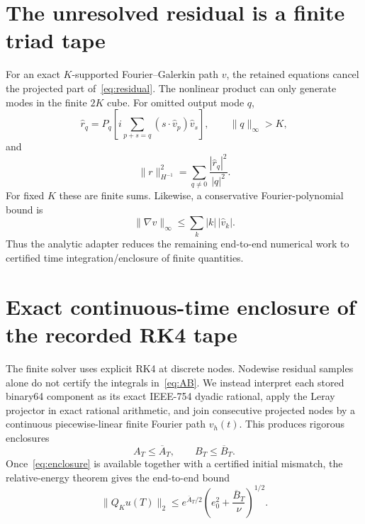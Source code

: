 \documentclass[11pt]{article}
\theoremstyle{definition}
\begin{document}
\section{The unresolved residual is a finite triad tape}

For an exact $K$-supported Fourier--Galerkin path $v$, the retained equations cancel the projected
part of~\eqref{eq:residual}.  The nonlinear product can only generate modes in the finite
$2K$ cube.  For omitted output mode $q$,
\begin{equation}\label{eq:residualmode}
\widehat r_q
=
P_q\left[
 i\sum_{p+s=q}(s\cdot\widehat v_p)\widehat v_s
\right],
\qquad \|q\|_\infty>K,
\end{equation}
and
\begin{equation}\label{eq:hminusone}
\|r\|_{H^{-1}}^2
=
\sum_{q\ne0}\frac{|\widehat r_q|^2}{|q|^2}.
\end{equation}
For fixed $K$ these are finite sums.  Likewise, a conservative Fourier-polynomial bound is
\begin{equation}\label{eq:gradlinf}
\|\nabla v\|_\infty
\le
\sum_{k}|k|\,|\widehat v_k|.
\end{equation}
Thus the analytic adapter reduces the remaining end-to-end numerical work to certified time
integration/enclosure of finite quantities.

\section{Exact continuous-time enclosure of the recorded RK4 tape}

The finite solver uses explicit RK4 at discrete nodes.  Nodewise residual samples alone do not
certify the integrals in~\eqref{eq:AB}.  We instead interpret each stored binary64 component as
its exact IEEE-754 dyadic rational, apply the Leray projector in exact rational arithmetic, and
join consecutive projected nodes by a continuous piecewise-linear finite Fourier path $v_h(t)$.
This produces rigorous enclosures
\begin{equation}\label{eq:enclosure}
A_T\le\overline A_T,
\qquad
B_T\le\overline B_T.
\end{equation}
Once~\eqref{eq:enclosure} is available together with a certified initial mismatch, the
relative-energy theorem gives the end-to-end bound
\begin{equation}\label{eq:endtoend}
\|Q_Ku(T)\|_2
\le
e^{\overline A_T/2}
\left(e_0^2+\frac{\overline B_T}{\nu}\right)^{1/2}.
\end{equation}
\end{document}
